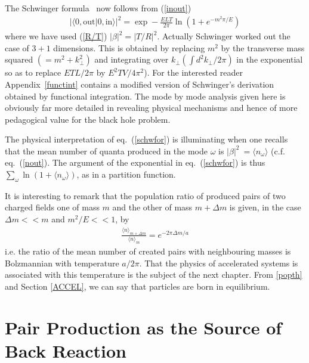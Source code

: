 \documentclass[12pt,oneside]{report}
\begin{document}
\par The Schwinger formula~\cite{Schw} now follows from (\ref{inout})
\begin{eqnarray}
\left|\langle 0, \mbox{out} | 0,\mbox{in} \rangle\right|^2 = \exp -
\frac{ELT}{2\pi} \ln \left(1 + e^{-m^2\pi/E} \right) 
\label{schwfor}
\end{eqnarray}
where we have used (\ref{R/T}) 
$|\beta|^2 = |T/R|^2$.  Actually Schwinger
worked out the case of $3+1$ dimensions.  This is obtained by replacing
$m^2$ by the transverse mass squared $(=m^2 + k^2_{\perp})$ and integrating
over $k_{\perp}(\int d^2 k_\perp/2\pi)$ in the exponential so as to
replace $ETL/2\pi$ by $E^2TV/4\pi^2$).  For the interested reader
Appendix~\ref{functint} contains a modified version of Schwinger's derivation 
obtained by functional integration.  
The mode by mode analysis
given here is obviously far more detailed in revealing physical
mechanisms and hence of more pedagogical value for the black hole
problem. 

The physical interpretation of eq.~(\ref{schwfor}) is 
illuminating when one recalls that the mean number of quanta produced in
the mode  $\omega$ is $|\beta|^2 \  =\langle
n_{\omega} \rangle$ (c.f. eq.~(\ref{nout}). The argument of 
the exponential in eq.~(\ref{schwfor}) is thus $\sum_{\omega}\ln (1+\langle 
n_{\omega} \rangle )$, as in 
a partition function.

It is interesting to remark that the population ratio of produced pairs of
two charged fields one of mass $m$ and the other of mass $m + \Delta m$
is given, in the case $\Delta m << m$ and $ m^2 /E << 1$, by
\begin{eqnarray}
\frac{\langle n \rangle_{m+ \Delta m}}{\langle n \rangle_{m}} 
= e^{- 2\pi \Delta m /a}
\label{popth}
\end{eqnarray}
i.e. the ratio of the mean number of created pairs with neighbouring masses
is Bolzmannian with temperature $a/2 \pi$. That the physics of accelerated 
systems is associated with this temperature is the subject of the next
chapter. From \ref{popth} and Section \ref{ACCEL}, we can say that particles are born in
equilibrium.


\section{Pair Production as the Source of Back Reaction}\label{pair}
\end{document}
